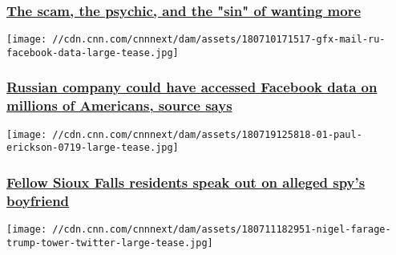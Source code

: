 \hypertarget{the-scam-the-psychic-and-the-sin-of-wanting-more-1}{%
\subsubsection{\texorpdfstring{\href{https://www.cnn.com/interactive/2018/07/investigates/maria-duval-psychic-scam-invs/index.html}{The
scam, the psychic, and the "sin" of wanting
more}}{The scam, the psychic, and the "sin" of wanting more}}\label{the-scam-the-psychic-and-the-sin-of-wanting-more-1}}

\href{https://money.cnn.com/2018/07/12/technology/facebook-mailru-russia/index.html}{}

\texttt{[image: //cdn.cnn.com/cnnnext/dam/assets/180710171517-gfx-mail-ru-facebook-data-large-tease.jpg]}

\hypertarget{russian-company-could-have-accessed-facebook-data-on-millions-of-americans-source-says}{%
\subsubsection{\texorpdfstring{\href{https://money.cnn.com/2018/07/12/technology/facebook-mailru-russia/index.html}{Russian
company could have accessed Facebook data on millions of Americans,
source
says}}{Russian company could have accessed Facebook data on millions of Americans, source says}}\label{russian-company-could-have-accessed-facebook-data-on-millions-of-americans-source-says}}

\href{/2018/07/22/politics/sioux-falls-residents-paul-erickson-maria-butina/index.html}{}

\texttt{[image: //cdn.cnn.com/cnnnext/dam/assets/180719125818-01-paul-erickson-0719-large-tease.jpg]}

\hypertarget{fellow-sioux-falls-residents-speak-out-on-alleged-spys-boyfriend-}{%
\subsubsection{\texorpdfstring{\href{/2018/07/22/politics/sioux-falls-residents-paul-erickson-maria-butina/index.html}{Fellow
Sioux Falls residents speak out on alleged spy's boyfriend
}}{Fellow Sioux Falls residents speak out on alleged spy's boyfriend }}\label{fellow-sioux-falls-residents-speak-out-on-alleged-spys-boyfriend-}}

\href{/2018/07/12/politics/donald-trump-british-operatives-windmills-emails/index.html}{}

\texttt{[image: //cdn.cnn.com/cnnnext/dam/assets/180711182951-nigel-farage-trump-tower-twitter-large-tease.jpg]}

